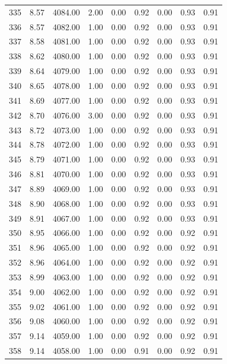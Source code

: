 \documentclass{article}\usepackage[]{graphicx}\usepackage[]{color}
\begin{document}
\begin{longtable}{rrrrrrrrr}
  335 & 8.57 & 4084.00 & 2.00 & 0.00 & 0.92 & 0.00 & 0.93 & 0.91 \\ 
  336 & 8.57 & 4082.00 & 1.00 & 0.00 & 0.92 & 0.00 & 0.93 & 0.91 \\ 
  337 & 8.58 & 4081.00 & 1.00 & 0.00 & 0.92 & 0.00 & 0.93 & 0.91 \\ 
  338 & 8.62 & 4080.00 & 1.00 & 0.00 & 0.92 & 0.00 & 0.93 & 0.91 \\ 
  339 & 8.64 & 4079.00 & 1.00 & 0.00 & 0.92 & 0.00 & 0.93 & 0.91 \\ 
  340 & 8.65 & 4078.00 & 1.00 & 0.00 & 0.92 & 0.00 & 0.93 & 0.91 \\ 
  341 & 8.69 & 4077.00 & 1.00 & 0.00 & 0.92 & 0.00 & 0.93 & 0.91 \\ 
  342 & 8.70 & 4076.00 & 3.00 & 0.00 & 0.92 & 0.00 & 0.93 & 0.91 \\ 
  343 & 8.72 & 4073.00 & 1.00 & 0.00 & 0.92 & 0.00 & 0.93 & 0.91 \\ 
  344 & 8.78 & 4072.00 & 1.00 & 0.00 & 0.92 & 0.00 & 0.93 & 0.91 \\ 
  345 & 8.79 & 4071.00 & 1.00 & 0.00 & 0.92 & 0.00 & 0.93 & 0.91 \\ 
  346 & 8.81 & 4070.00 & 1.00 & 0.00 & 0.92 & 0.00 & 0.93 & 0.91 \\ 
  347 & 8.89 & 4069.00 & 1.00 & 0.00 & 0.92 & 0.00 & 0.93 & 0.91 \\ 
  348 & 8.90 & 4068.00 & 1.00 & 0.00 & 0.92 & 0.00 & 0.93 & 0.91 \\ 
  349 & 8.91 & 4067.00 & 1.00 & 0.00 & 0.92 & 0.00 & 0.93 & 0.91 \\ 
  350 & 8.95 & 4066.00 & 1.00 & 0.00 & 0.92 & 0.00 & 0.92 & 0.91 \\ 
  351 & 8.96 & 4065.00 & 1.00 & 0.00 & 0.92 & 0.00 & 0.92 & 0.91 \\ 
  352 & 8.96 & 4064.00 & 1.00 & 0.00 & 0.92 & 0.00 & 0.92 & 0.91 \\ 
  353 & 8.99 & 4063.00 & 1.00 & 0.00 & 0.92 & 0.00 & 0.92 & 0.91 \\ 
  354 & 9.00 & 4062.00 & 1.00 & 0.00 & 0.92 & 0.00 & 0.92 & 0.91 \\ 
  355 & 9.02 & 4061.00 & 1.00 & 0.00 & 0.92 & 0.00 & 0.92 & 0.91 \\ 
  356 & 9.08 & 4060.00 & 1.00 & 0.00 & 0.92 & 0.00 & 0.92 & 0.91 \\ 
  357 & 9.14 & 4059.00 & 1.00 & 0.00 & 0.92 & 0.00 & 0.92 & 0.91 \\ 
  358 & 9.14 & 4058.00 & 1.00 & 0.00 & 0.91 & 0.00 & 0.92 & 0.91 \\ 

\end{longtable}
\end{document}
